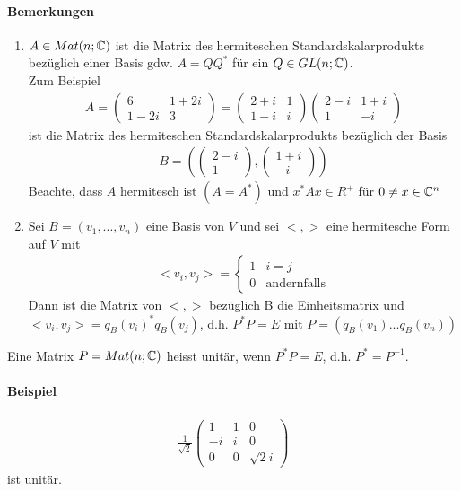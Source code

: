 \paragraph{Bemerkungen}
\begin{enumerate}
\item $A \in Mat(n; \mathbb{C})$ ist die Matrix des hermiteschen Standardskalarprodukts bezüglich einer Basis gdw. $A = QQ^{*}$ für ein $Q \in GL(n; \mathbb{C})$. \\
Zum Beispiel
\begin{align}
A = \begin{pmatrix} 6 & 1+2i \\ 1-2i & 3 \end{pmatrix} = \begin{pmatrix} 2+i & 1 \\ 1-i & i \end{pmatrix} \begin{pmatrix} 2-i & 1+i \\ 1 & -i\end{pmatrix}
\end{align}
ist die Matrix des hermiteschen Standardskalarprodukts bezüglich der Basis
\begin{align}
B = \left( \begin{pmatrix} 2-i \\ 1 \end{pmatrix}, \begin{pmatrix} 1 + i \\ -i \end{pmatrix} \right)
\end{align}
Beachte, dass $A$ hermitesch ist $(A = A^{*})$ und $x^{*} A x \in R^{+}$ für $0 \neq x \in \mathbb{C}^{n}$

\item Sei $B = (v_1, ..., v_n)$ eine Basis von $V$ und sei $<, >$ eine hermitesche Form auf $V$ mit
\begin{align}
<v_i, v_j> = \left\{ \begin{matrix} 1 & i=j \\ 0 & \text{andernfalls} \end{matrix} \right.
\end{align}
Dann ist die Matrix von $<, >$ bezüglich B die Einheitsmatrix und $<v_i, v_j> = q_{B}(v_i)^{*} q_{B}(v_j)$, d.h. $P^{*}P = E$ mit $P = (q_{B}(v_1) ... q_{B}(v_n))$
\end{enumerate}
Eine Matrix $P = Mat(n; \mathbb{C})$ heisst unitär, wenn $P^{*}P = E$, d.h. $P^{*} = P^{-1}$.

\paragraph{Beispiel}
\begin{align}
\frac{1}{\sqrt{2}}\begin{pmatrix} 1 & 1 & 0 \\ -i & i & 0 \\ 0 & 0 & \sqrt{2}i \end{pmatrix}
\end{align}
ist unitär.

